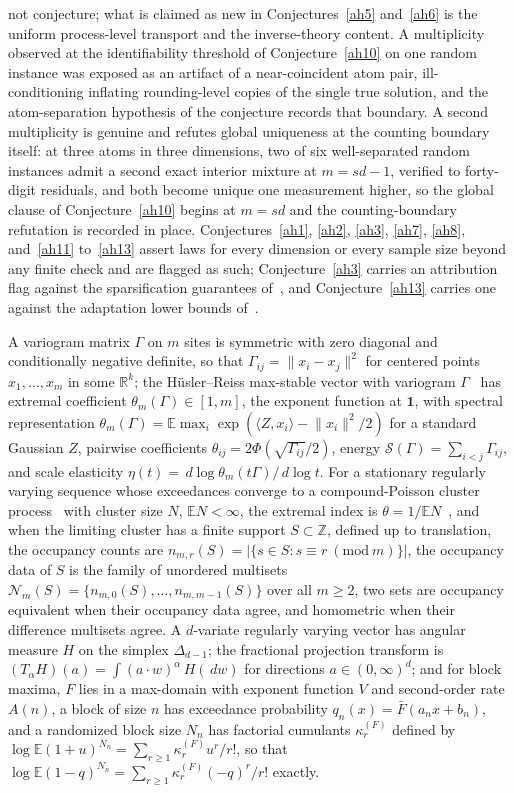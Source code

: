 \documentclass[11pt]{article}
\theoremstyle{definition}
\newcommand{\E}{\mathbb E}
\newcommand{\Z}{\mathbb Z}
\newcommand{\R}{\mathbb R}
\newcommand{\dd}{\,d}
\providecommand{\Z}{\mathbb Z}
\providecommand{\R}{\mathbb R}
\providecommand{\E}{\mathbb E}
\begin{document}
not conjecture; what is claimed as new in Conjectures~\ref{ah5} and~\ref{ah6} is the uniform process-level transport and the inverse-theory content.  A multiplicity observed at the identifiability threshold of Conjecture~\ref{ah10} on one random instance was exposed as an artifact of a near-coincident atom pair, ill-conditioning inflating rounding-level copies of the single true solution, and the atom-separation hypothesis of the conjecture records that boundary.  A second multiplicity is genuine and refutes global uniqueness at the counting boundary itself: at three atoms in three dimensions, two of six well-separated random instances admit a second exact interior mixture at $m=sd-1$, verified to forty-digit residuals, and both become unique one measurement higher, so the global clause of Conjecture~\ref{ah10} begins at $m=sd$ and the counting-boundary refutation is recorded in place.  Conjectures~\ref{ah1}, \ref{ah2}, \ref{ah3}, \ref{ah7}, \ref{ah8}, and~\ref{ah11} to~\ref{ah13} assert laws for every dimension or every sample size beyond any finite check and are flagged as such; Conjecture~\ref{ah3} carries an attribution flag against the sparsification guarantees of~\cite{EAR26}, and Conjecture~\ref{ah13} carries one against the adaptation lower bounds of~\cite{CK15}.

A variogram matrix $\Gamma$ on $m$ sites is symmetric with zero diagonal and conditionally negative definite, so that $\Gamma_{ij}=\lVert x_i-x_j\rVert^2$ for centered points $x_1,\ldots,x_m$ in some $\R^k$; the H\"usler--Reiss max-stable vector with variogram $\Gamma$~\cite{HR89} has extremal coefficient $\theta_m(\Gamma)\in[1,m]$, the exponent function at $\mathbf 1$, with spectral representation $\theta_m(\Gamma)=\E\max_i\exp(\langle Z,x_i\rangle-\lVert x_i\rVert^2/2)$ for a standard Gaussian $Z$, pairwise coefficients $\theta_{ij}=2\Phi(\sqrt{\Gamma_{ij}}/2)$, energy $\mathcal S(\Gamma)=\sum_{i<j}\Gamma_{ij}$, and scale elasticity $\eta(t)=\dd\log\theta_m(t\Gamma)/\dd\log t$.  For a stationary regularly varying sequence whose exceedances converge to a compound-Poisson cluster process~\cite{BS09} with cluster size $N$, $\E N<\infty$, the extremal index is $\theta=1/\E N$~\cite{Lea83,OB87}, and when the limiting cluster has a finite support $S\subset\Z$, defined up to translation, the occupancy counts are $n_{m,r}(S)=|\{s\in S:s\equiv r\ (\mathrm{mod}\ m)\}|$, the occupancy data of $S$ is the family of unordered multisets $\mathcal N_m(S)=\{n_{m,0}(S),\ldots,n_{m,m-1}(S)\}$ over all $m\ge2$, two sets are occupancy equivalent when their occupancy data agree, and homometric when their difference multisets agree.  A $d$-variate regularly varying vector has angular measure $H$ on the simplex $\Delta_{d-1}$; the fractional projection transform is $(T_\alpha H)(a)=\int(a\cdot w)^\alpha\,H(\dd w)$ for directions $a\in(0,\infty)^d$; and for block maxima, $F$ lies in a max-domain with exponent function $V$ and second-order rate $A(n)$, a block of size $n$ has exceedance probability $q_n(x)=\bar F(a_nx+b_n)$, and a randomized block size $N_n$ has factorial cumulants $\kappa_r^{(F)}$ defined by $\log\E(1+u)^{N_n}=\sum_{r\ge1}\kappa_r^{(F)}u^r/r!$, so that $\log\E(1-q)^{N_n}=\sum_{r\ge1}\kappa_r^{(F)}(-q)^r/r!$ exactly.
\end{document}
